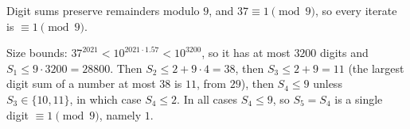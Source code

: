Digit sums preserve remainders modulo $9$, and $37\equiv1\pmod9$, so every iterate is $\equiv1\pmod9$.

Size bounds: $37^{2021}<10^{2021\cdot1.57}<10^{3200}$, so it has at most $3200$ digits and $S_1\le9\cdot3200=28800$. Then $S_2\le2+9\cdot4=38$, then $S_3\le2+9=11$ (the largest digit sum of a number at most $38$ is $11$, from $29$), then $S_4\le9$ unless $S_3\in\{10,11\}$, in which case $S_4\le2$. In all cases $S_4\le9$, so $S_5=S_4$ is a single digit $\equiv1\pmod9$, namely $\boxed{1}$.
